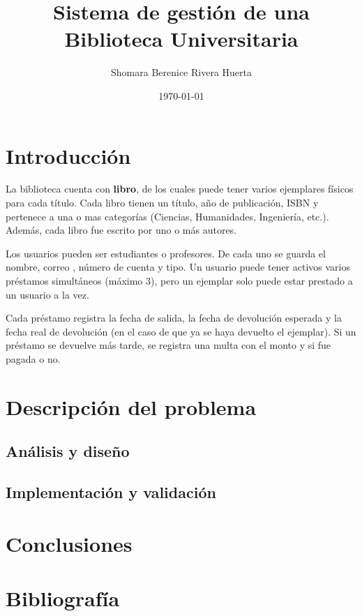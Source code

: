 \documentclass[10pt,letterpaper]{article}
\title{Sistema de gestión de una Biblioteca Universitaria}
\author{Shomara Berenice Rivera Huerta}
\date{\today}
\begin{document}
\maketitle
\tableofcontents
\lstlistoflistings

\section{Introducción}

La biblioteca cuenta con \textbf{libro}, de los cuales puede tener varios ejemplares físicos para cada título. Cada libro tienen un título, año de publicación, ISBN y pertenece a una o mas categorías (Ciencias, Humanidades, Ingeniería, etc.). Además, cada libro fue escrito por uno o más autores.

Los usuarios pueden ser estudiantes o profesores. De cada uno se guarda el nombre, correo , número de cuenta y tipo. Un usuario puede tener activos varios préstamos simultáneos (máximo 3), pero un ejemplar solo puede estar prestado a un usuario a la vez.

Cada préstamo registra la fecha de salida, la fecha de devolución esperada y la fecha real de devolución (en el caso de que ya se haya devuelto el ejemplar). Si un préstamo se devuelve más tarde, se registra una multa con el monto y si fue pagada o no.

\section{Descripción del problema}
\subsection{Análisis y diseño}
\subsection{Implementación y validación}



\section{Conclusiones}

\section{Bibliografía}
\end{document}

